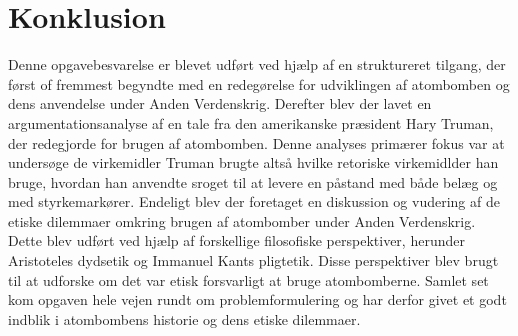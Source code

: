 \newpage
\section{Konklusion}
Denne opgavebesvarelse er blevet udført ved hjælp af en struktureret tilgang, der først of fremmest begyndte med en redegørelse for udviklingen af atombomben og dens anvendelse under Anden Verdenskrig. Derefter blev der lavet en argumentationsanalyse af en tale fra den amerikanske præsident Hary Truman, der redegjorde for brugen af atombomben. Denne analyses primærer fokus var at undersøge de virkemidler Truman brugte altså hvilke retoriske virkemidlder han bruge, hvordan han anvendte sroget til at levere en påstand med både belæg og med styrkemarkører. Endeligt blev der foretaget en diskussion og vudering af de etiske dilemmaer omkring brugen af atombomber under Anden Verdenskrig. Dette blev udført ved hjælp af forskellige filosofiske perspektiver, herunder Aristoteles dydsetik og Immanuel Kants pligtetik. Disse perspektiver blev brugt til at udforske om det var etisk forsvarligt at bruge atombomberne. Samlet set kom opgaven hele vejen rundt om problemformulering og har derfor givet et godt indblik i atombombens historie og dens etiske dilemmaer.
